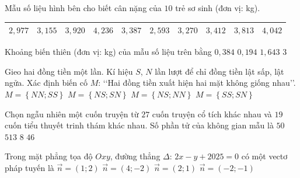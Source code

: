 \begin{ex}%
	Mẫu số liệu hình bên cho biết cân nặng của $10$ trẻ sơ sinh (đơn vị: kg).
	\begin{center}
		\begin{tabular}{|c|c|c|c|c|c|c|c|c|c|}
			\hline
			$2{,}977$ & $3{,}155$ & $3{,}920$ & $4{,}236$ & $3{,}387$ & $2{,}593$ & $3{,}270$ & $3{,}412$ & $3{,}813$ & $4{,}042$ \\
			\hline
		\end{tabular}
	\end{center}
	Khoảng biến thiên (đơn vị: kg) của mẫu số liệu trên bằng
	\choice
	{$0{,}384$}
	{$0{,}194$}
	{\True $1{,}643$}
	{$3$}
\end{ex}

\begin{ex}%
	Gieo hai đồng tiền một lần. Kí hiệu $S$, $N$ lần lượt để chỉ đồng tiền lật sấp, lật ngửa. Xác định biến cố $M$: \lq\lq Hai đồng tiền xuất hiện hai mặt không giống nhau\rq\rq.
	\choice
	{$M = \left\{NN; SS\right\}$}
	{\True $M = \left\{NS; SN\right\}$}
	{$M = \left\{NS; NN\right\}$}
	{$M = \left\{SS; SN\right\}$}
\end{ex}

\begin{ex}%
	Chọn ngẫu nhiên một cuốn truyện từ $27$ cuốn truyện cổ tích khác nhau và $19$ cuốn tiểu thuyết trinh thám khác nhau. Số phần tử của không gian mẫu là
	\choice
	{$50$}
	{$513$}
	{$8$}
	{\True$46$}
\end{ex}

\begin{ex}%
	Trong mặt phẳng tọa độ $Oxy$, đường thẳng $\Delta$: $2x-y+2025=0$ có một vectơ pháp tuyến là
	\choice
	{$\overrightarrow{n}=(1;2)$}
	{\True$\overrightarrow{n}=(4;-2)$}
	{$\overrightarrow{n}=(2;1)$}
	{$\overrightarrow{n}=(-2;-1)$}
\end{ex}

